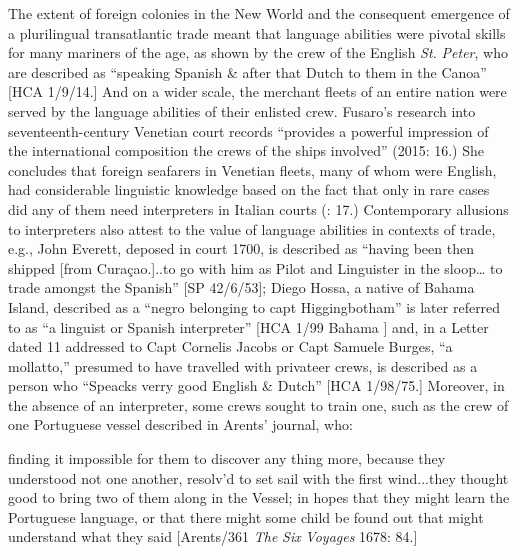 The extent of foreign colonies in the New World and the consequent emergence of a plurilingual transatlantic trade meant that language abilities were pivotal skills for many mariners of the age, as shown by the crew of the English \textit{St.} \textit{Peter}, who are described as “speaking Spanish \& after that Dutch to them in the Canoa” [HCA 1/9/14.] And on a wider scale, the merchant fleets of an entire nation were served by the language abilities of their enlisted crew. Fusaro’s research into seventeenth-century Venetian court records “provides a powerful impression of the international composition the crews of the ships involved” (2015: 16.) She concludes that foreign seafarers in Venetian fleets, many of whom were English, had considerable linguistic knowledge based on the fact that only in rare cases did any of them need interpreters in Italian courts (\citealt{Fusaro2015}: 17.) Contemporary allusions to interpreters also attest to the value of language abilities in contexts of trade, e.g., John Everett, deposed in court 1700, is described as “having been then shipped [from Curaçao.]..to go with him as Pilot and Linguister in the sloop… to trade amongst the Spanish” [SP 42/6/53]; Diego Hossa, a native of Bahama Island, described as a “negro belonging to capt Higgingbotham” is later referred to as “a linguist or Spanish interpreter” [HCA 1/99 Bahama \citealt{Islands1722}] and, in a Letter dated 11 \citealt{January1697} addressed to Capt Cornelis Jacobs or Capt Samuele Burges, “a mollatto,” presumed to have travelled with privateer crews, is described as a person who “Speacks verry good English \& Dutch” [HCA 1/98/75.] Moreover, in the absence of an interpreter, some crews sought to train one, such as the crew of one Portuguese vessel described in Arents’ journal, who:

finding it impossible for them to discover any thing more, because they understood not one another, resolv’d to set sail with the first wind...they thought good to bring two of them along in the Vessel; in hopes that they might learn the Portuguese language, or that there might some child be found out that might understand what they said [Arents/361 \textit{The} \textit{Six} \textit{Voyages} 1678: 84.] 

